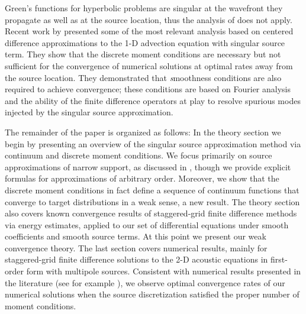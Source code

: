 Green's functions for hyperbolic problems are singular at the wavefront they propagate as well as at the source location, thus the analysis of \cite{TorEng:04} does not apply.
Recent work by \cite{Petersson:2016} presented some of the most relevant analysis based on centered difference approximations to the 1-D advection equation with singular source term.
They show that the discrete moment conditions are necessary but not sufficient for the convergence of numerical solutions at optimal rates away from the source location.
They demonstrated that {\emph smoothness conditions} are also required to achieve convergence; these conditions are based on Fourier analysis and the ability of the finite difference operators at play to resolve spurious modes injected by the singular source approximation. 

The remainder of the paper is organized as follows:
In the theory section we begin by presenting an overview of the singular source approximation method via continuum and discrete moment conditions.
We focus primarily on source approximations of narrow support, as discussed in \cite{TorEng:04}, though we provide explicit formulas for approximations of arbitrary order.
Moreover, we show that the discrete moment conditions in fact define a sequence of continuum functions that converge to target distributions in a weak sense, a new result.
The theory section also covers known convergence results of staggered-grid finite difference methods via energy estimates, applied to our set of differential equations under smooth coefficients and smooth source terms.
At this point we present our weak convergence theory.
The last section covers numerical results, mainly for staggered-grid finite difference solutions to the 2-D acoustic equations in first-order form with multipole sources.
Consistent with numerical results presented in the literature (see for example \cite{Petersson:2010}), we observe optimal convergence rates of our numerical solutions when the source discretization satisfied the proper number of moment conditions.


